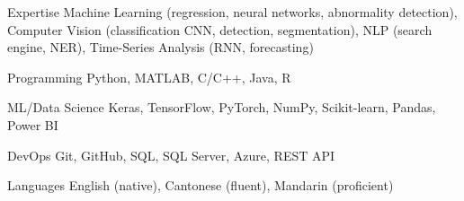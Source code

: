 

\begin{cvskills}

  \cvskill
    {Expertise} %
    {Machine Learning (regression, neural networks, abnormality detection), Computer Vision (classification CNN, detection, segmentation), NLP (search engine, NER), Time-Series Analysis (RNN, forecasting)} %

  \cvskill
    {Programming} %
    {Python, MATLAB, C/C++, Java, R} %
		
  \cvskill
    {ML/Data Science} %
    {Keras, TensorFlow, PyTorch, NumPy, Scikit-learn, Pandas, Power BI} %

  \cvskill
    {DevOps} %
		{Git, GitHub, SQL, SQL Server, Azure, REST API}



  \cvskill
    {Languages} %
    {English (native), Cantonese (fluent), Mandarin (proficient)} %

\end{cvskills}
